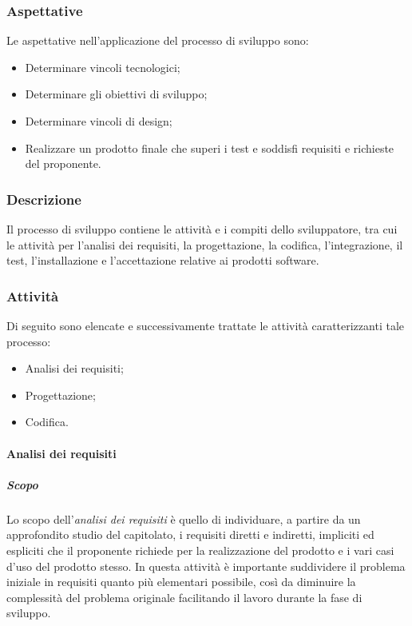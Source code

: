     \subsubsection{Aspettative} \label{subsubsection:Sviluppo_Aspettative}
    Le aspettative nell’applicazione del processo di sviluppo sono:
    \begin{itemize}
        \item Determinare vincoli tecnologici;
        \item Determinare gli obiettivi di sviluppo;
        \item Determinare vincoli di design;
        \item Realizzare un prodotto finale che superi i test e soddisfi requisiti e richieste del proponente.
    \end{itemize}

    \subsubsection{Descrizione} \label{subsubsection:Sviluppo_Descrizione}
    Il processo di sviluppo contiene le attività e i compiti dello sviluppatore, tra cui le attività per l’analisi dei requisiti, la progettazione, 
    la codifica, l’integrazione, il test, l’installazione e l’accettazione relative ai prodotti software.

    \subsubsection{Attività} \label{subsubsection:Attivita'}
    Di seguito sono elencate e successivamente trattate le attività caratterizzanti tale processo:
    \begin{itemize}
        \item Analisi dei requisiti;
        \item Progettazione;
        \item Codifica.
    \end{itemize}
    
        \paragraph{Analisi dei requisiti} \label{paragraph:Analisi dei requisiti}
            \subparagraph{Scopo}
            Lo scopo dell’\textit{analisi dei requisiti} è quello di individuare, a partire da un approfondito studio del capitolato, i requisiti diretti e indiretti,
            impliciti ed espliciti che il proponente richiede per la realizzazione del prodotto e i vari casi d'uso del prodotto stesso. In questa attività è importante
            suddividere il problema iniziale in requisiti quanto più elementari possibile, così da diminuire la complessità del problema originale
             facilitando il lavoro durante la fase di sviluppo.

